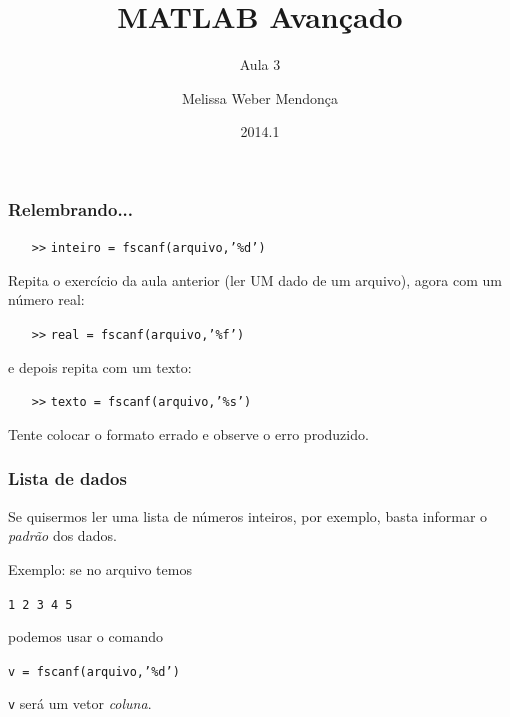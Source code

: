 \documentclass{beamer}
\title{MATLAB Avançado}
\subtitle{Aula 3}
\author[M. Weber Mendonça]{Melissa Weber Mendonça}
\institute[UFSC]{\inst{1} Universidade Federal de Santa Catarina}
\date{2014.1}
\newcommand{\code}[1]{{\texttt{#1}}}
\newcommand{\acode}[1]{\alert{\texttt{#1}}}
\newcommand{\ac}{\alert{\texttt{>>}}}
\newcommand{\file}[3]{\texttt{
   \begin{center}
      \begin{tikzpicture}
         \node[mybox] (box) {
            \begin{minipage}{#1}
               #3
            \end{minipage}
         };
         \node[draw, fill=white, text=black, right=10pt, rounded corners] at (box.north west) {
            \textbf{#2}
         };
      \end{tikzpicture}
   \end{center}}
}
\begin{document}
\begin{frame}
  \titlepage
\end{frame}
\begin{frame}
   \frametitle{Relembrando...}
   \begin{itemize}
      \item[\ac] \code{inteiro = \acode{fscanf}(arquivo,’\%d’)}
   \end{itemize}
   Repita o exercício da aula anterior (ler UM dado de um arquivo), agora com um número real:
   \begin{itemize}
      \item[\ac] \code{real = \acode{fscanf}(arquivo,’\%f’)}
   \end{itemize}
   e depois repita com um texto:
   \begin{itemize}
      \item[\ac] \code{texto = \acode{fscanf}(arquivo,’\%s’)}
   \end{itemize}
   \vfill
   Tente colocar o formato errado e observe o erro produzido.
\end{frame}
\begin{frame}
   \frametitle{Lista de dados}
   Se quisermos ler uma lista de números inteiros, por exemplo, basta informar o \emph{padrão} dos dados. 

   Exemplo: se no arquivo temos
   \begin{center}
      \code{1 2 3 4 5}
   \end{center}
   podemos usar o comando
   \begin{center}
      \code{v = \acode{fscanf}(arquivo,'\%d')}
   \end{center}
   \code{v} será um vetor \emph{coluna}. 
\end{frame}
\end{document}
